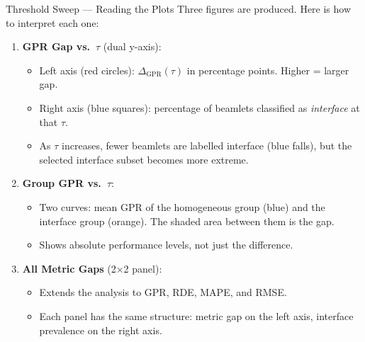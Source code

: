 \documentclass[aspectratio=169, 10pt]{beamer}
\begin{document}
\begin{frame}{Threshold Sweep — Reading the Plots}
  Three figures are produced.  Here is how to interpret each one:

  \vspace{4pt}
  \begin{enumerate}
    \item \textbf{GPR Gap vs.\ $\tau$} (dual y-axis):
    \begin{itemize}
      \item \textcolor{red!70!black}{Left axis (red circles)}: $\Delta_{\text{GPR}}(\tau)$ in
            percentage points.  Higher = larger gap.
      \item \textcolor{blue!70!black}{Right axis (blue squares)}: percentage of beamlets
            classified as \emph{interface} at that $\tau$.
      \item As $\tau$ increases, fewer beamlets are labelled interface
            (blue falls), but the selected interface subset becomes
            more extreme.
    \end{itemize}

    \vspace{4pt}
    \item \textbf{Group GPR vs.\ $\tau$}:
    \begin{itemize}
      \item Two curves: mean GPR of the homogeneous group (blue) and the
            interface group (orange).  The \textcolor{red!20!white}{shaded area} between them is the gap.
      \item Shows absolute performance levels, not just the difference.
    \end{itemize}

    \vspace{4pt}
    \item \textbf{All Metric Gaps} (2$\times$2 panel):
    \begin{itemize}
      \item Extends the analysis to GPR, RDE, MAPE, and RMSE.
      \item Each panel has the same structure: metric gap on the left axis,
            interface prevalence on the right axis.
    \end{itemize}
  \end{enumerate}
\end{frame}
\end{document}
